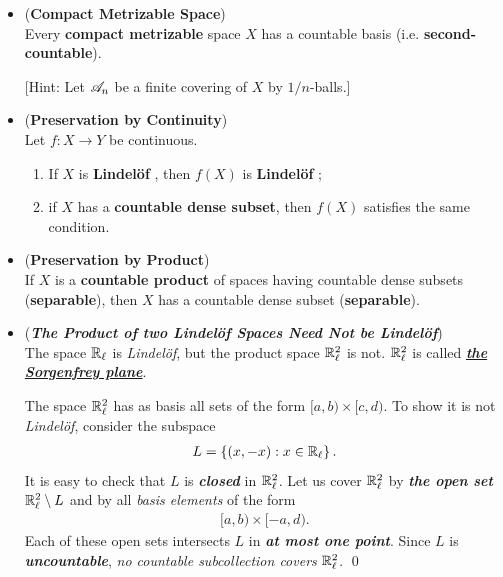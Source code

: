 \documentclass[11pt]{article}
\begin{document}
\begin{itemize}
\item \begin{proposition}  (\textbf{Compact Metrizable Space}) \citep{munkres2000topology}\\
Every \textbf{compact metrizable} space $X$ has a countable basis (i.e. \textbf{second-countable}). 
\end{proposition} [Hint: Let ${\mathscr A}_n$ be a finite covering of $X$ by $1/n$-balls.]

\item \begin{proposition} (\textbf{Preservation by Continuity}) \citep{munkres2000topology}\\
Let $f : X \rightarrow Y$ be continuous. 
\begin{enumerate}
\item If $X$ is \textbf{Lindel{\"o}f }, then $f(X)$ is \textbf{Lindel{\"o}f };
\item if $X$ has a \textbf{countable dense subset}, then $f(X)$ satisfies the same condition.
\end{enumerate}
\end{proposition}

\item \begin{proposition}(\textbf{Preservation by Product}) \citep{munkres2000topology}\\
If $X$ is a \textbf{countable product} of spaces having countable dense subsets (\textbf{separable}), then $X$ has a countable dense subset (\textbf{separable}). 
\end{proposition}

\item \begin{example} (\emph{\textbf{The Product of two Lindel{\"o}f Spaces Need Not be Lindel{\"o}f}})\\
The space ${\mathbb R}_{\ell}$ is \emph{Lindel{\"o}f}, but the product space ${\mathbb R}_{\ell}^2$ is not. ${\mathbb R}_{\ell}^2$ is called \underline{\emph{\textbf{the Sorgenfrey plane}}}.

The space ${\mathbb R}_{\ell}^2$ has as basis all sets of the form $[a, b) \times [c, d)$. To show it is not \emph{Lindel{\"o}f}, consider the subspace
\begin{align*}
L = \left\{(x, -x): x\in {\mathbb R}_{\ell}\right\}.
\end{align*}
It is easy to check that $L$ is \emph{\textbf{closed}} in ${\mathbb R}_{\ell}^2$. Let us cover ${\mathbb R}_{\ell}^2$ by \emph{\textbf{the open set}} ${\mathbb R}_{\ell}^2 \setminus L$ and by
all \emph{basis elements} of the form
\begin{align*}
[a, b) \times [-a, d).
\end{align*}
Each of these open sets intersects $L$ in \emph{\textbf{at most one point}}. Since $L$ is \emph{\textbf{uncountable}}, \emph{no countable subcollection covers} ${\mathbb R}_{\ell}^2$. \qed
\end{example}


\end{itemize}
\end{document}
